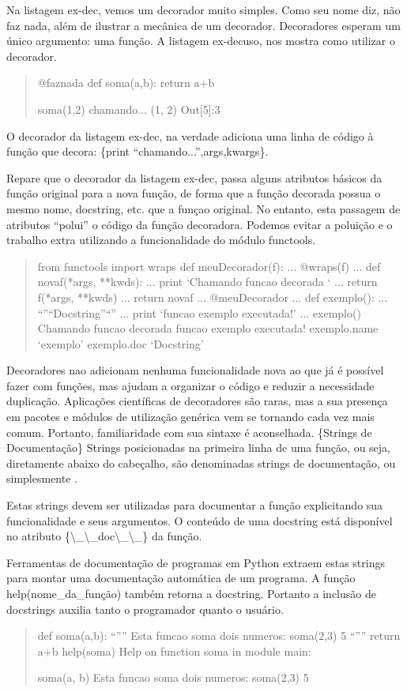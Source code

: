 \documentclass[a4paper,10pt,portuguese]{sphinxmanual}
\begin{document}
Na listagem ex-dec, vemos um decorador muito simples. Como seu nome
diz, não faz nada, além de ilustrar a mecânica de um decorador.
Decoradores esperam um único argumento: uma função. A listagem
ex-decuso, nos mostra como utilizar o decorador.
\begin{quote}

@faznada def soma(a,b): return a+b

soma(1,2) chamando... (1, 2) Out{[}5{]}:3
\end{quote}

O decorador da listagem ex-dec, na verdade adiciona uma linha de
código à função que decora: \{print ``chamando...'',args,kwargs\}.

Repare que o decorador da listagem ex-dec, passa alguns atributos
básicos da função original para a nova função, de forma que a
função decorada possua o mesmo nome, docstring, etc. que a funçao
original. No entanto, esta passagem de atributos ``polui'' o código
da função decoradora. Podemos evitar a poluição e o trabalho extra
utilizando a funcionalidade do módulo functools.
\begin{quote}

from functools import wraps def meuDecorador(f): ... @wraps(f) ...
def novaf(*args, **kwds): ... print `Chamando funcao decorada `
... return f(*args, **kwds) ... return novaf ... @meuDecorador
... def exemplo(): ... ``''``Docstring''``'' ... print `funcao exemplo
executada!' ... exemplo() Chamando funcao decorada funcao exemplo
executada! exemplo.name `exemplo' exemplo.doc `Docstring'
\end{quote}

Decoradores nao adicionam nenhuma funcionalidade nova ao que já é
possível fazer com funções, mas ajudam a organizar o código e
reduzir a necessidade duplicação. Aplicações científicas de
decoradores são raras, mas a sua presença em pacotes e módulos de
utilização genérica vem se tornando cada vez mais comum. Portanto,
familiaridade com sua sintaxe é aconselhada.
\{Strings de Documentação\} Strings posicionadas na primeira linha de
uma função, ou seja, diretamente abaixo do cabeçalho, são
denominadas strings de documentação, ou simplesmente
.

Estas strings devem ser utilizadas para documentar a função
explicitando sua funcionalidade e seus argumentos. O conteúdo de
uma docstring está disponível no atributo \{\textbackslash{}\_\textbackslash{}\_doc\textbackslash{}\_\textbackslash{}\_\} da
função.

Ferramentas de documentação de programas em Python extraem estas
strings para montar uma documentação automática de um programa. A
função help(nome\_da\_função) também retorna a docstring. Portanto
a inclusão de docstrings auxilia tanto o programador quanto o
usuário.
\begin{quote}

def soma(a,b): ``'''' Esta funcao soma dois numeros: soma(2,3) 5 ``''''
return a+b help(soma) Help on function soma in module main:

soma(a, b) Esta funcao soma dois numeros: soma(2,3) 5
\end{quote}
\end{document}
